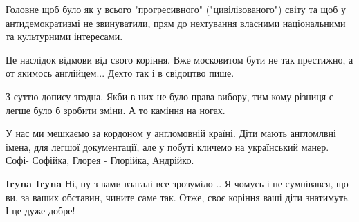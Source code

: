 \begin{itemize}
\begin{itemize}
Головне щоб було як у всього "прогресивного" ("цивілізованого") світу та щоб у
антидемократизмі не звинуватили, прям до нехтування власними національними та
культурними інтересами.

\end{itemize}

 

Це наслідок відмови від свого коріння. Вже московитом бути не так престижно, а
от якимось англійцем... Дехто так і в свідоцтво пише.


 

З суттю допису згодна. Якби в них не було права вибору, тим кому різниця є
легше було б зробити зміни. А то каміння на ногах.


 

У нас ми мешкаємо за кордоном у англомовній країні. Діти мають англомлвні
імена, для легшої документації, але у побуті кличемо на український манер.
Софі- Софійка, Глорея - Глорійка, Андрійко.

\begin{itemize}
 
\textbf{Iryna Iryna} Ні, ну з вами взагалі все зрозуміло \Smiley[1.0][yellow].. Я чомусь і не
сумнівався, що ви, за ваших обставин, чините саме так. Отже, своє коріння ваші
діти знатимуть. І це дуже добре!

 

\end{itemize}
\end{itemize}
